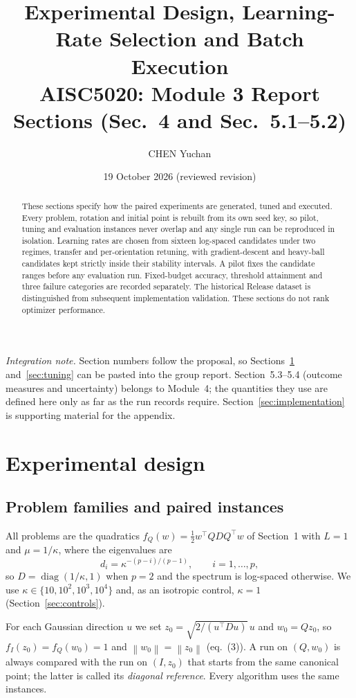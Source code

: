 \documentclass[11pt,a4paper]{article}
\title{Experimental Design, Learning-Rate Selection and Batch Execution\\[0.35em]
\large AISC5020: Module 3 Report Sections (Sec.~4 and Sec.~5.1--5.2)}
\author{CHEN Yuchan}
\date{19 October 2026 (reviewed revision)}
\newcommand{\diag}{\operatorname{diag}}
\newcommand{\norm}[1]{\left\lVert#1\right\rVert}
\begin{document}
\maketitle
\begin{abstract}
These sections specify how the paired experiments are generated, tuned and
executed. Every problem, rotation and initial point is rebuilt from its own seed
key, so pilot, tuning and evaluation instances never overlap and any single run
can be reproduced in isolation. Learning rates are chosen from sixteen
log-spaced candidates under two regimes, transfer and per-orientation
retuning, with gradient-descent and heavy-ball candidates kept strictly inside
their stability intervals. A pilot fixes the candidate ranges before any
evaluation run. Fixed-budget accuracy, threshold attainment and three failure
categories are recorded separately. The historical Release dataset is
distinguished from subsequent implementation validation. These sections do
not rank optimizer performance.
\end{abstract}

\noindent\emph{Integration note.} Section numbers follow the proposal, so
Sections~\ref{sec:design} and~\ref{sec:tuning} can be pasted into the group
report. Section~5.3--5.4 (outcome measures and uncertainty) belongs to Module~4;
the quantities they use are defined here only as far as the run records require.
Section~\ref{sec:implementation} is supporting material for the appendix.

\setcounter{section}{3}
\section{Experimental design}\label{sec:design}

\subsection{Problem families and paired instances}
All problems are the quadratics $f_Q(w)=\tfrac12 w^\top QDQ^\top w$ of
Section~1 with $L=1$ and $\mu=1/\kappa$, where the eigenvalues are
\begin{equation}
  d_i=\kappa^{-(p-i)/(p-1)},\qquad i=1,\dots,p,
\end{equation}
so $D=\diag(1/\kappa,1)$ when $p=2$ and the spectrum is log-spaced otherwise.
We use $\kappa\in\{10,10^2,10^3,10^4\}$ and, as an isotropic control,
$\kappa=1$ (Section~\ref{sec:controls}).

For each Gaussian direction $u$ we set $z_0=\sqrt{2/(u^\top Du)}\,u$ and
$w_0=Qz_0$, so $f_I(z_0)=f_Q(w_0)=1$ and $\norm{w_0}=\norm{z_0}$ (eq.~(3)).
A run on $(Q,w_0)$ is always compared with the run on $(I,z_0)$ that starts from
the same canonical point; the latter is called its \emph{diagonal reference}.
Every algorithm uses the same instances.
\end{document}
